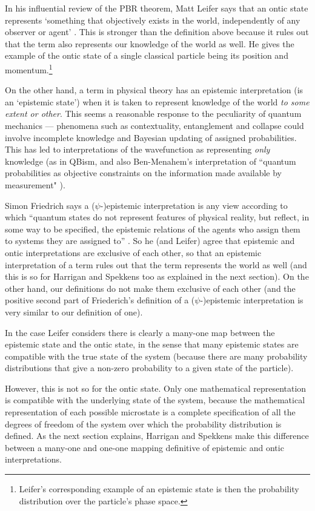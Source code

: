 \documentclass[superscriptaddress, floatfix,nofootinbib,12pt]{revtex4-2}
\begin{document}
In his influential review of the PBR theorem, Matt Leifer says that an ontic state represents `something that objectively exists in the world, independently of any observer or agent' \cite{Leifer2014Review}. This is stronger than the definition above because it rules out that the term also represents our knowledge of the world as well. He gives the example of the ontic state of a single classical particle being its position and momentum.\footnote{Leifer's corresponding example of an epistemic state is then the probability distribution over the particle's phase space.}

On the other hand, a term in physical theory has an epistemic interpretation (is an `epistemic state') when it is taken to represent knowledge of the world \emph{to some extent or other}. This seems a reasonable response to the peculiarity of quantum mechanics --- phenomena such as contextuality, entanglement and collapse could involve incomplete knowledge and Bayesian updating of assigned probabilities. This has led to interpretations of the wavefunction as representing \emph{only} knowledge (as in QBism, and also Ben-Menahem's interpretation of ``quantum probabilities as objective constraints on the information made available by measurement" \cite{Benmenahem2017PBR}).

Simon Friedrich says a ($\psi$-)epistemic interpretation is any view according to which ``quantum states do not represent features of physical reality, but reflect, in some way to be specified, the epistemic relations of the agents who assign them to systems they are assigned to'' \cite{friederich2014Interpreting}. So he (and Leifer) agree that epistemic and ontic interpretations are exclusive of each other, so that an epistemic interpretation of a term rules out that the term represents the world as well (and this is so for Harrigan and Spekkens too as explained in the next section). On the other hand, our definitions do not make them exclusive of each other (and the positive second part of Friederich's definition of a ($\psi$-)epistemic interpretation is very similar to our definition of one).

In the case Leifer considers there is clearly a many-one map between the epistemic state and the ontic state, in the sense that many epistemic states are compatible with the true state of the system (because there are many probability distributions that give a non-zero probability to a given state of the particle). 

However, this is not so for the ontic state. Only one mathematical representation is compatible with the underlying state of the system, because the mathematical representation of each possible microstate is a complete specification of all the degrees of freedom of the system over which the probability distribution is defined. As the next section explains, Harrigan and Spekkens make this difference between a many-one and one-one mapping definitive of epistemic and ontic interpretations.
\end{document}
